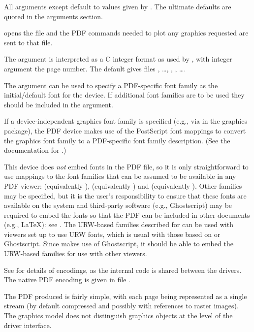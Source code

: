 \begin{Details}\relax
All arguments except  default to values given by
.  The ultimate defaults are quoted in the
arguments section.

 opens the file  and the PDF commands needed to
plot any graphics requested are sent to that file.

The  argument is interpreted as a C integer format as used
by , with integer argument the page number.
The default gives files , \dots, ,
, \dots.

The  argument can be used to specify a PDF-specific
font family as the initial/default font for the device.  If additional
font families are to be used they should be included in the
 argument.

If a device-independent \R{} graphics font family is specified (e.g., via
 in the graphics package), the PDF device makes use
of the PostScript font mappings to convert the \R{} graphics font family
to a PDF-specific font family description.  (See the
documentation for .)

This device does \emph{not} embed fonts in the PDF file, so it is only
straightforward to use mappings to the font families that can be
assumed to be available in any PDF viewer: 
(equivalently ),  (equivalently
) and  (equivalently ).
Other families may be specified, but it is the user's responsibility
to ensure that these fonts are available on the system and third-party
software (e.g., Ghostscript) may be required to embed the fonts so
that the PDF can be included in other documents (e.g., LaTeX): see
.  The URW-based families described for
 can be used with viewers
set up to use URW fonts, which is usual with those based on
 or Ghostscript.
Since  makes use of Ghostscript, it should be
able to embed the URW-based families for use with other viewers.

See  for details of encodings, as the internal
code is shared between the drivers.  The native PDF encoding is given
in file .

The PDF produced is fairly simple, with each page being represented as
a single stream (by default compressed and possibly with references to
raster images).  The \R{} graphics model does not distinguish graphics
objects at the level of the driver interface.


\end{Details}
